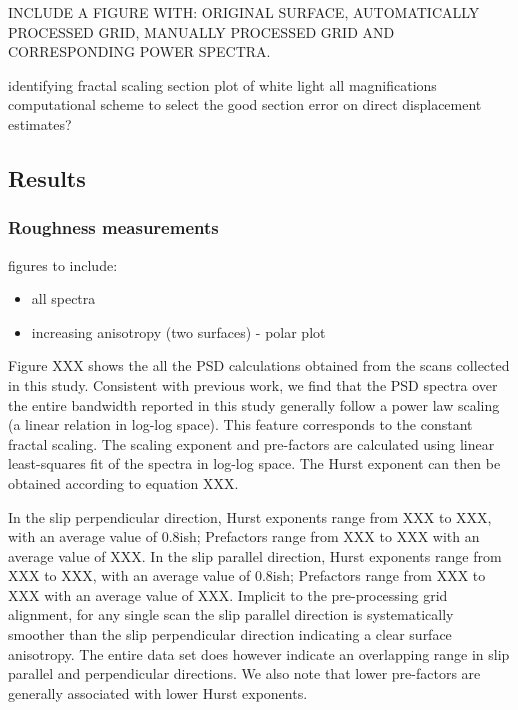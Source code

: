 \documentclass[12pt,a4paper]{article}
\begin{document}
INCLUDE A FIGURE WITH: ORIGINAL SURFACE, AUTOMATICALLY PROCESSED GRID, MANUALLY PROCESSED GRID AND CORRESPONDING POWER SPECTRA.


identifying fractal scaling section
	plot of white light all magnifications
	computational scheme to select the good section
error on direct displacement estimates?

\subsection{Results}

	
\subsubsection{Roughness measurements}

figures to include:
\begin{itemize}
\item all spectra
\item increasing anisotropy (two surfaces) - polar plot

\end{itemize}

Figure XXX shows the all the PSD calculations obtained from the scans collected in this study. Consistent with previous work, we find that the PSD spectra over the entire bandwidth reported in this study generally follow a power law scaling (a linear relation in log-log space). This feature corresponds to the constant fractal scaling. The scaling exponent and pre-factors are calculated using linear least-squares fit of the spectra in log-log space. The Hurst exponent can then be obtained according to equation XXX.

In the slip perpendicular direction, Hurst exponents range from XXX to XXX, with an average value of 0.8ish; Prefactors range from  XXX to XXX with an average value of XXX. In the slip parallel direction, Hurst exponents range from XXX to XXX, with an average value of 0.8ish; Prefactors range from  XXX to XXX with an average value of XXX. Implicit to the pre-processing grid alignment, for any single scan the slip parallel direction is systematically smoother than the slip perpendicular direction indicating a clear surface anisotropy. The entire data set does however indicate an overlapping range in slip parallel and perpendicular directions. We also note that lower pre-factors are generally associated with lower Hurst exponents.
\end{document}
